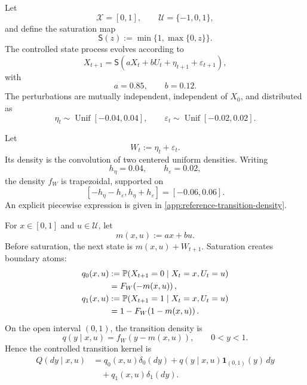 \documentclass[10pt,twocolumn]{article}
\theoremstyle{remark}
\newcommand{\Pp}{\mathbb{P}}
\newcommand{\Ucal}{\mathcal{U}}
\newcommand{\Xcal}{\mathcal{X}}
\newcommand{\one}{\mathbf{1}}
\begin{document}
Let
\[
\Xcal=[0,1],
\qquad
\Ucal=\{-1,0,1\},
\]
and define the saturation map
\begin{equation}
	\mathsf S(z)
	:=
	\min\{1,\max\{0,z\}\}.
	\label{eq:saturation-map}
\end{equation}
The controlled state process evolves according to
\begin{equation}
	X_{t+1}
	=
	\mathsf S
	\left(
	aX_t+bU_t+\eta_{t+1}+\varepsilon_{t+1}
	\right),
	\label{eq:reference-saturated-dynamics}
\end{equation}
with
\begin{equation}
	a=0.85,
	\qquad
	b=0.12.
	\label{eq:reference-dynamic-parameters}
\end{equation}
The perturbations are mutually independent, independent of \(X_0\), and distributed as
\begin{equation}
	\eta_t\sim\operatorname{Unif}[-0.04,0.04],
	\qquad
	\varepsilon_t\sim\operatorname{Unif}[-0.02,0.02].
	\label{eq:reference-noise-laws}
\end{equation}

Let
\[
W_t:=\eta_t+\varepsilon_t.
\]
Its density is the convolution of two centered uniform densities. Writing
\[
h_\eta=0.04,
\qquad
h_\varepsilon=0.02,
\]
the density \(f_W\) is trapezoidal, supported on
\[
[-h_\eta-h_\varepsilon,h_\eta+h_\varepsilon]
=
[-0.06,0.06].
\]
An explicit piecewise expression is given in
\cref{app:reference-transition-density}.

For \(x\in[0,1]\) and \(u\in\Ucal\), let
\[
m(x,u):=ax+bu.
\]
Before saturation, the next state is \(m(x,u)+W_{t+1}\). Saturation creates boundary atoms:
\begin{align}
	q_0(x,u)
	&:=
	\Pp(X_{t+1}=0\mid X_t=x,U_t=u)
	\notag\\
	&=
	F_W\!\left(-m(x,u)\right),
	\label{eq:lower-atom-probability}
	\\
	q_1(x,u)
	&:=
	\Pp(X_{t+1}=1\mid X_t=x,U_t=u)
	\notag\\
	&=
	1-F_W\!\left(1-m(x,u)\right).
	\label{eq:upper-atom-probability}
\end{align}
On the open interval \((0,1)\), the transition density is
\begin{equation*}
	q(y\mid x,u)
	=
	f_W\!\left(y-m(x,u)\right),
	\qquad 0<y<1.
	\label{eq:reference-transition-density}
\end{equation*}
Hence the controlled transition kernel is
\begin{equation}
	\begin{aligned}
		Q(dy\mid x,u)
		&=
		q_0(x,u)\delta_0(dy)
		+
		q(y\mid x,u)\one_{(0,1)}(y)\,dy
		\\
		&\quad+
		q_1(x,u)\delta_1(dy).
	\end{aligned}
	\label{eq:reference-transition-kernel}
\end{equation}
\end{document}
